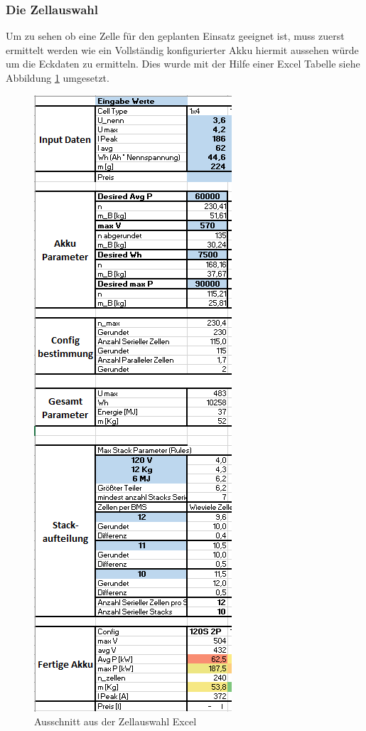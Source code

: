 \FloatBarrier
\subsubsection{Die Zellauswahl}
Um zu sehen ob eine Zelle für den geplanten Einsatz geeignet ist, muss zuerst ermittelt werden wie ein Vollständig konfigurierter Akku hiermit aussehen würde um die Eckdaten zu ermitteln. Dies wurde mit der Hilfe einer Excel Tabelle siehe Abbildung \ref{fig:Ausschnitt_zellvergleich} umgesetzt. 
\begin{figure}[h]
	\centering
	\includegraphics[width=0.2\linewidth]{bilder/Ausschnitt_zellvergleich}
	\caption{Ausschnitt aus der Zellauswahl Excel}
	\label{fig:Ausschnitt_zellvergleich}
\end{figure}

